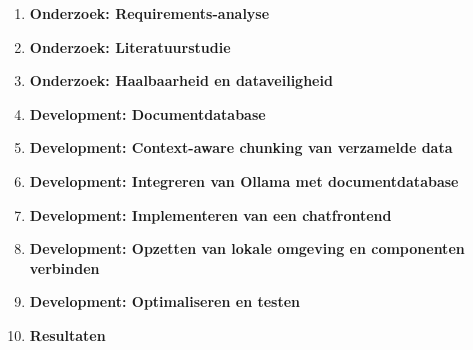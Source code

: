 \begin{enumerate}
    \item \textbf{Onderzoek: Requirements-analyse}
    \item \textbf{Onderzoek: Literatuurstudie}
    \item \textbf{Onderzoek: Haalbaarheid en dataveiligheid} 

    \item \textbf{Development: Documentdatabase}
    \item \textbf{Development: Context-aware chunking van verzamelde data}
    \item \textbf{Development: Integreren van Ollama met documentdatabase}
    \item \textbf{Development: Implementeren van een chatfrontend}
    \item \textbf{Development: Opzetten van lokale omgeving en componenten verbinden}
    \item \textbf{Development: Optimaliseren en testen}  

    \item \textbf{Resultaten}
\end{enumerate} 



